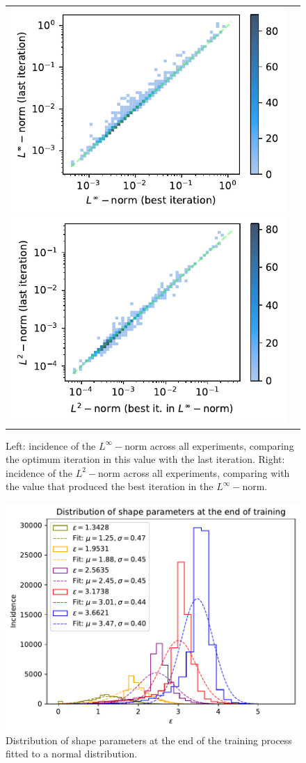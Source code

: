 \documentclass[12pt]{report} %
\begin{document}
\begin{figure}[h]
  \hspace*{-2cm}
  \begin{tabular}{cc}
    \includegraphics[width=.6\textwidth]{imagenes/experiments/2d/pde_parabola/incidence_of_linf.pdf}
  \includegraphics[width=.6\textwidth]{imagenes/experiments/2d/pde_parabola/incidence_of_l2.pdf}
  \end{tabular}
  \caption{Left: incidence of the $L^\infty-$norm across all experiments, comparing the optimum iteration in this value with the last iteration. Right: incidence of the $L^2-$norm across all experiments, comparing with the value that produced the best iteration in the $L^\infty-$norm.}
  \label{fig:pde-2d-results-incidence-l-norms}
\end{figure}



\begin{figure}[h]
  \includegraphics[width=.8\textwidth]{imagenes/experiments/2d/pde_parabola/distribution_of_shape_parameters_at_end_of_training.pdf}
  \caption{Distribution of shape parameters at the end of the training process fitted to a normal distribution.}
  \label{fig:2d-pde-results-shape-parameters}
\end{figure}
\end{document}
